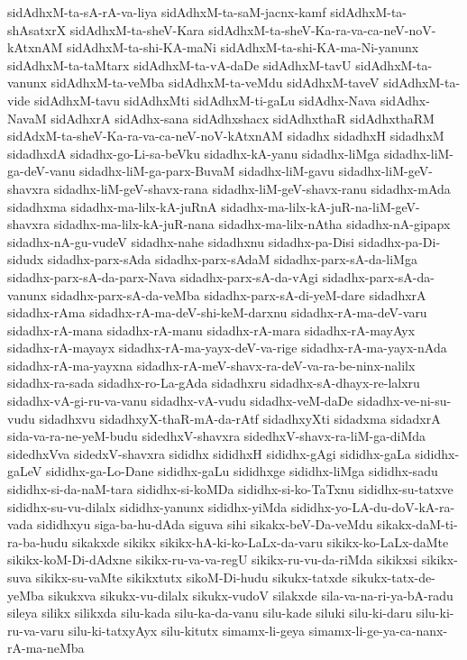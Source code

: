 {sidAdhxM-ta-sA-rA-va-liya
sidAdhxM-ta-saM-jacnx-kamf
sidAdhxM-ta-shAsatxrX
sidAdhxM-ta-sheV-Kara
sidAdhxM-ta-sheV-Ka-ra-va-ca-neV-noV-kAtxnAM
sidAdhxM-ta-shi-KA-maNi
sidAdhxM-ta-shi-KA-ma-Ni-yanunx
sidAdhxM-ta-taMtarx
sidAdhxM-ta-vA-daDe
sidAdhxM-tavU
sidAdhxM-ta-vanunx
sidAdhxM-ta-veMba
sidAdhxM-ta-veMdu
sidAdhxM-taveV
sidAdhxM-ta-vide
sidAdhxM-tavu
sidAdhxMti
sidAdhxM-ti-gaLu
sidAdhx-Nava
sidAdhx-NavaM
sidAdhxrA
sidAdhx-sana
sidAdhxshacx
sidAdhxthaR
sidAdhxthaRM
sidAdxM-ta-sheV-Ka-ra-va-ca-neV-noV-kAtxnAM
sidadhx
sidadhxH
sidadhxM
sidadhxdA
sidadhx-go-Li-sa-beVku
sidadhx-kA-yanu
sidadhx-liMga
sidadhx-liM-ga-deV-vanu
sidadhx-liM-ga-parx-BuvaM
sidadhx-liM-gavu
sidadhx-liM-geV-shavxra
sidadhx-liM-geV-shavx-rana
sidadhx-liM-geV-shavx-ranu
sidadhx-mAda
sidadhxma
sidadhx-ma-lilx-kA-juRnA
sidadhx-ma-lilx-kA-juR-na-liM-geV-shavxra
sidadhx-ma-lilx-kA-juR-nana
sidadhx-ma-lilx-nAtha
sidadhx-nA-gipapx
sidadhx-nA-gu-vudeV
sidadhx-nahe
sidadhxnu
sidadhx-pa-Disi
sidadhx-pa-Di-sidudx
sidadhx-parx-sAda
sidadhx-parx-sAdaM
sidadhx-parx-sA-da-liMga
sidadhx-parx-sA-da-parx-Nava
sidadhx-parx-sA-da-vAgi
sidadhx-parx-sA-da-vanunx
sidadhx-parx-sA-da-veMba
sidadhx-parx-sA-di-yeM-dare
sidadhxrA
sidadhx-rAma
sidadhx-rA-ma-deV-shi-keM-darxnu
sidadhx-rA-ma-deV-varu
sidadhx-rA-mana
sidadhx-rA-manu
sidadhx-rA-mara
sidadhx-rA-mayAyx
sidadhx-rA-mayayx
sidadhx-rA-ma-yayx-deV-va-rige
sidadhx-rA-ma-yayx-nAda
sidadhx-rA-ma-yayxna
sidadhx-rA-meV-shavx-ra-deV-va-ra-be-ninx-nalilx
sidadhx-ra-sada
sidadhx-ro-La-gAda
sidadhxru
sidadhx-sA-dhayx-re-lalxru
sidadhx-vA-gi-ru-va-vanu
sidadhx-vA-vudu
sidadhx-veM-daDe
sidadhx-ve-ni-su-vudu
sidadhxvu
sidadhxyX-thaR-mA-da-rAtf
sidadhxyXti
sidadxma
sidadxrA
sida-va-ra-ne-yeM-budu
sidedhxV-shavxra
sidedhxV-shavx-ra-liM-ga-diMda
sidedhxVva
sidedxV-shavxra
sididhx
sididhxH
sididhx-gAgi
sididhx-gaLa
sididhx-gaLeV
sididhx-ga-Lo-Dane
sididhx-gaLu
sididhxge
sididhx-liMga
sididhx-sadu
sididhx-si-da-naM-tara
sididhx-si-koMDa
sididhx-si-ko-TaTxnu
sididhx-su-tatxve
sididhx-su-vu-dilalx
sididhx-yanunx
sididhx-yiMda
sididhx-yo-LA-du-doV-kA-ra-vada
sididhxyu
siga-ba-hu-dAda
siguva
sihi
sikakx-beV-Da-veMdu
sikakx-daM-ti-ra-ba-hudu
sikakxde
sikikx
sikikx-hA-ki-ko-LaLx-da-varu
sikikx-ko-LaLx-daMte
sikikx-koM-Di-dAdxne
sikikx-ru-va-va-regU
sikikx-ru-vu-da-riMda
sikikxsi
sikikx-suva
sikikx-su-vaMte
sikikxtutx
sikoM-Di-hudu
sikukx-tatxde
sikukx-tatx-de-yeMba
sikukxva
sikukx-vu-dilalx
sikukx-vudoV
silakxde
sila-va-na-ri-ya-bA-radu
sileya
silikx
silikxda
silu-kada
silu-ka-da-vanu
silu-kade
siluki
silu-ki-daru
silu-ki-ru-va-varu
silu-ki-tatxyAyx
silu-kitutx
simamx-li-geya
simamx-li-ge-ya-ca-nanx-rA-ma-neMba
}
